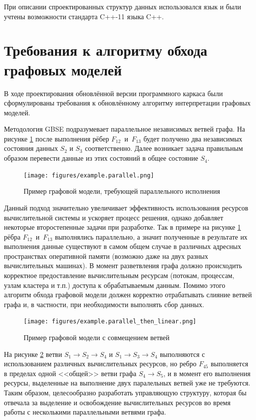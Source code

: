 При описании спроектированных структур данных использовался язык  и были учтены возможности стандарта C++-11 языка C++.
\section{Требования к алгоритму обхода графовых моделей}\label{sec:algorithm_task}
В ходе проектирования обновлённой версии программного каркаса были сформулированы требования к обновлённому алгоритму интерпретации графовых моделей.

Методология GBSE подразумевает параллельное независимых ветвей графа. На рисунке \ref{fig:parallelExample} после выполнения рёбер $F_{12}$~и~$F_{13}$ будет получено два независимых состояния данных $S_2$ и $S_3$ соответственно. Далее возникает задача правильным образом перевести данные из этих состояний в общее состояние $S_4$.
\begin{figure}[!ht]
    \centering
    \texttt{[image: figures/example.parallel.png]}
    \caption{Пример графовой модели, требующей параллельного исполнения}
    \label{fig:parallelExample}
\end{figure}

Данный подход значительно увеличивает эффективность использования ресурсов вычислительной системы и ускоряет процесс решения, однако добавляет некоторые второстепенные задачи при разработке. Так в примере на рисунке \ref{fig:parallelExample} рёбра $F_{12}$~и~$F_{13}$ выполнялись параллельно, а значит полученные в результате их выполнения данные существуют в самом общем случае в различных адресных пространствах оперативной памяти (возможно даже на двух разных вычислительных машинах). В момент разветвления графа должно происходить корректное предоставление вычислительным ресурсам (потокам, процессам, узлам кластера и т.п.) доступа к обрабатываемым данным. Помимо этого алгоритм обхода графовой модели должен корректно отрабатывать слияние ветвей графа и, в частности, при необходимости выполнять сбор данных.

\begin{figure}[!ht]
    \centering
    \texttt{[image: figures/example.parallel\_then\_linear.png]}
    \caption{Пример графовой модели с совмещением ветвей}
    \label{fig:parallelThenLinearExample}
\end{figure}

На рисунке \ref{fig:parallelThenLinearExample} ветви $S_1 \rightarrow S_2 \rightarrow S_4$ и $S_1 \rightarrow S_3 \rightarrow S_4$ выполняются с использованием различных вычислительных ресурсов, но ребро $F_{45}$ выполняется в пределах одной <<общей>> ветви графа $S_4 \rightarrow S_5$, и в момент его выполнения ресурсы, выделенные на выполнение двух паралельных ветвей уже не требуются. Таким образом, целесообразно разработать управляющую структуру, которая бы отвечала за выделение и освобождение вычислительных ресурсов во время работы с несколькими параллельными ветвями графа.

